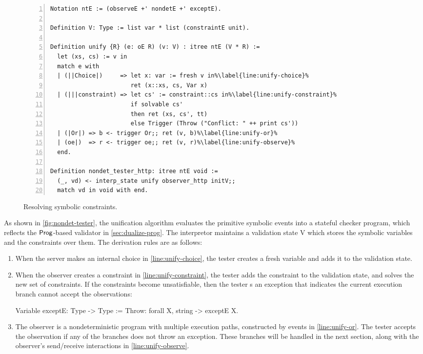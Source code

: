 \begin{figure}
\begin{lstlisting}[numbers=left]
Notation ntE := (observeE +' nondetE +' exceptE).

Definition V: Type := list var * list (constraintE unit).
  
Definition unify {R} (e: oE R) (v: V) : itree ntE (V * R) :=
  let (xs, cs) := v in
  match e with
  | (||Choice|)     => let x: var := fresh v in%\label{line:unify-choice}%
                       ret (x::xs, cs, Var x)
  | (|||constraint) => let cs' := constraint::cs in%\label{line:unify-constraint}%
                       if solvable cs'
                       then ret (xs, cs', tt)
                       else Trigger (Throw ("Conflict: " ++ print cs'))
  | (|Or|) => b <- trigger Or;; ret (v, b)%\label{line:unify-or}%
  | (oe|)  => r <- trigger oe;; ret (v, r)%\label{line:unify-observe}%
  end.

Definition nondet_tester_http: itree ntE void :=
  (_, vd) <- interp_state unify observer_http initV;;
  match vd in void with end.
\end{lstlisting}
\caption{Resolving symbolic constraints.}
\label{fig:nondet-tester}
\end{figure}

As shown in \autoref{fig:nondet-tester}, the unification algorithm evaluates the
primitive symbolic events into a stateful checker program, which reflects the
$\mathsf{Prog}$-based validator in \autoref{sec:dualize-prog}.  The interpretor
maintains a validation state \ilc V which stores the symbolic variables and the
constraints over them.  The derivation rules are as follows:
\begin{enumerate}
  \item When the server makes an internal choice in \autoref{line:unify-choice},
    the tester creates a fresh variable and adds it to the validation state.
  \item When the observer creates a constraint in
    \autoref{line:unify-constraint}, the tester adds the constraint to the
    validation state, and solves the new set of constraints.  If the constraints
    become unsatisfiable, then the tester s an exception that
    indicates the current execution branch cannot accept the observations:
\begin{coq}
  Variable exceptE: Type -> Type :=
    Throw: forall {X}, string -> exceptE X.
\end{coq}      
  \item The observer is a nondeterministic program with multiple execution
    paths, constructed by  events in \autoref{line:unify-or}.  The
    tester accepts the observation if any of the branches does not throw an
    exception.  These branches will be handled in the next section, along with
    the observer's send/receive interactions in \autoref{line:unify-observe}.
\end{enumerate}


